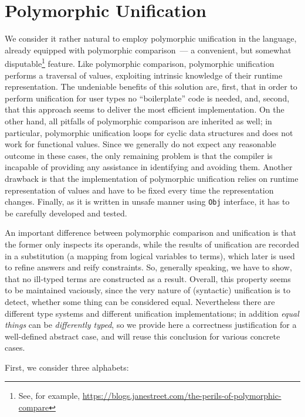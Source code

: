 \section{Polymorphic Unification}
\label{sec:unification}

We consider it rather natural to employ polymorphic unification in the language, already equipped 
with polymorphic comparison~--- a convenient, but somewhat disputable\footnote{See, for example, 
\url{https://blogs.janestreet.com/the-perils-of-polymorphic-compare}} feature. Like polymorphic comparison, 
polymorphic unification performs a traversal of values, exploiting intrinsic knowledge of their runtime 
representation. The undeniable benefits of this solution are, first, that in order to perform unification 
for user types no ``boilerplate'' code is needed, and, second, that this approach seems to deliver the
most efficient implementation. On the other hand, all pitfalls of polymorphic comparison are inherited as 
well; in particular, polymorphic unification loops for cyclic data structures and does not work for functional 
values. Since we generally do not expect any reasonable outcome in these cases, the only remaining problem is that
the compiler is incapable of providing any assistance in identifying and avoiding them. Another drawback is that 
the implementation of polymorphic unification relies on runtime representation of values and have to be fixed 
every time the representation changes.  Finally, as it is written in unsafe manner using \lstinline{Obj} interface, 
it has to be carefully developed and tested.

An important difference between polymorphic comparison and unification is that the former only inspects its operands, 
while the results of unification are recorded in a substitution (a mapping from logical variables to terms), which 
later is used to refine answers and reify constraints. So, generally speaking, we have to show, that no ill-typed 
terms are constructed as a result. Overall, this property seems to be maintained vaciously, since the very 
nature of (syntactic) unification is to detect, whether some thing can be considered equal. Nevertheless there are
different type systems and different unification implementations; in addition \emph{equal things} can be
\emph{differently typed}, so we provide here a correctness justification for a well-defined abstract case, and will 
reuse this conclusion for various concrete cases.

First, we consider three alphabets:

